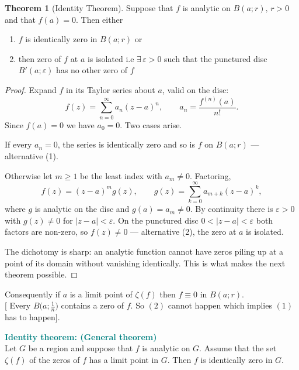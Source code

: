\documentclass[11pt,a4paper]{article}
\theoremstyle{definition}
\newtheorem{thm}{Theorem}[section]
\begin{document}
\begin{thm}[Identity Theorem]
Suppose that $f$ is analytic on $B(a;r),\, r> 0$ and that $f(a) = 0$. Then either
\begin{enumerate}
\item $f$ is identically zero in $B(a;r)$ or 
\item then zero of $f$ at $a$ is isolated i.e $\exists\, \varepsilon > 0 $ such that the punctured disc $B'(a;\varepsilon)$ has no other zero of $f$\\
\end{enumerate}

\begin{proof}
Expand $f$ in its Taylor series about $a$, valid on the disc:
$$f(z)=\sum_{n=0}^{\infty}a_n(z-a)^n,\qquad a_n=\frac{f^{(n)}(a)}{n!} .$$
Since $f(a)=0$ we have $a_0=0$. Two cases arise.

If every $a_n=0$, the series is identically zero and so is $f$ on
$B(a;r)$ --- alternative (1).

Otherwise let $m\geq 1$ be the least index with $a_m\neq 0$. Factoring,
$$f(z)=(z-a)^m g(z),\qquad
g(z)=\sum_{k=0}^{\infty}a_{m+k}(z-a)^{k},$$
where $g$ is analytic on the disc and $g(a)=a_m\neq 0$. By continuity there is
$\varepsilon>0$ with $g(z)\neq 0$ for $\left|z-a\right|<\varepsilon$. On the
punctured disc $0<\left|z-a\right|<\varepsilon$ both factors are non-zero, so
$f(z)\neq 0$ --- alternative (2), the zero at $a$ is isolated.

The dichotomy is sharp: an analytic function cannot have zeros piling up at a
point of its domain without vanishing identically. This is what makes the next
theorem possible.
\end{proof}


Consequently if $a$ is a limit point of $\zeta(f)$ then $f\equiv 0$ in $B(a;r).\, $\\
$\Big[$ Every $B\Big(a;\frac{1}{n}\Big)$ contains a zero of $f$. So $(2)$ cannot happen which implies $(1)$ has to happen$\Big]$.
\end{thm}

\textbf{\textcolor{teal}{Identity theorem: (General theorem)}}\\
Let $G$ be a region and suppose that $f$ is analytic on $G$. Assume that the set $\zeta (f)$ of the zeros of $f$ has a limit point in $G$. Then $f$ is identically zero in $G$.\\\\
\end{document}
